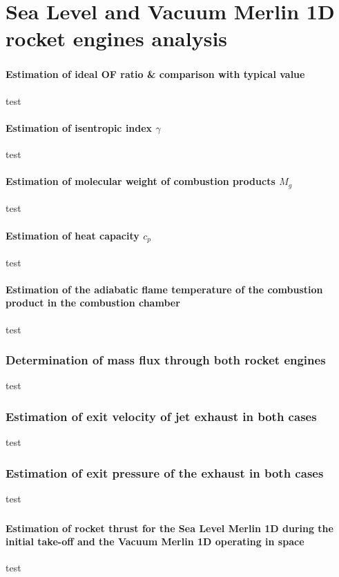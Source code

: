 \documentclass[11pt]{article}
\numberwithin{equation}{section}
\begin{document}
\part{Sea Level and Vacuum Merlin 1D rocket engines analysis}
\section{}
\subsection{Estimation of ideal OF ratio \& comparison with typical value}
test
\subsection{Estimation of isentropic index $\gamma$}
test
\subsection{Estimation of molecular weight of combustion products $M_g$}
test
\subsection{Estimation of heat capacity $c_p$}
test
\subsection{Estimation of the adiabatic flame temperature of the combustion product in the combustion chamber}
test
\section{Determination of mass flux through both rocket engines}
test
\section{Estimation of exit velocity of jet exhaust in both cases}
test
\section{Estimation of exit pressure of the exhaust in both cases}
test
\section{}
\subsection{Estimation of  rocket thrust for the Sea Level Merlin 1D during the initial take-off and the Vacuum Merlin 1D operating in space}
test
\end{document}

